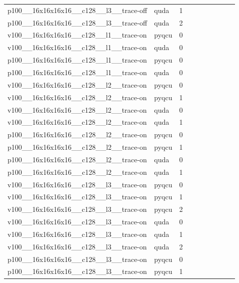 \begin{table}[htbp]
\begin{tabular}{@{}llrrrrrrrr@{}}
p100\_\_16x16x16x16\_\_c128\_\_l3\_\_trace-off & quda & 1 &  &  &  &  &  &  &  \\
p100\_\_16x16x16x16\_\_c128\_\_l3\_\_trace-off & quda & 2 &  &  &  &  &  &  &  \\
v100\_\_16x16x16x16\_\_c128\_\_l1\_\_trace-on & pyqcu & 0 &  &  &  &  &  &  &  \\
v100\_\_16x16x16x16\_\_c128\_\_l1\_\_trace-on & quda & 0 &  &  &  &  &  &  &  \\
p100\_\_16x16x16x16\_\_c128\_\_l1\_\_trace-on & pyqcu & 0 &  &  &  &  &  &  &  \\
p100\_\_16x16x16x16\_\_c128\_\_l1\_\_trace-on & quda & 0 &  &  &  &  &  &  &  \\
v100\_\_16x16x16x16\_\_c128\_\_l2\_\_trace-on & pyqcu & 0 &  &  &  &  &  &  &  \\
v100\_\_16x16x16x16\_\_c128\_\_l2\_\_trace-on & pyqcu & 1 &  &  &  &  &  &  &  \\
v100\_\_16x16x16x16\_\_c128\_\_l2\_\_trace-on & quda & 0 &  &  &  &  &  &  &  \\
v100\_\_16x16x16x16\_\_c128\_\_l2\_\_trace-on & quda & 1 &  &  &  &  &  &  &  \\
p100\_\_16x16x16x16\_\_c128\_\_l2\_\_trace-on & pyqcu & 0 &  &  &  &  &  &  &  \\
p100\_\_16x16x16x16\_\_c128\_\_l2\_\_trace-on & pyqcu & 1 &  &  &  &  &  &  &  \\
p100\_\_16x16x16x16\_\_c128\_\_l2\_\_trace-on & quda & 0 &  &  &  &  &  &  &  \\
p100\_\_16x16x16x16\_\_c128\_\_l2\_\_trace-on & quda & 1 &  &  &  &  &  &  &  \\
v100\_\_16x16x16x16\_\_c128\_\_l3\_\_trace-on & pyqcu & 0 &  &  &  &  &  &  &  \\
v100\_\_16x16x16x16\_\_c128\_\_l3\_\_trace-on & pyqcu & 1 &  &  &  &  &  &  &  \\
v100\_\_16x16x16x16\_\_c128\_\_l3\_\_trace-on & pyqcu & 2 &  &  &  &  &  &  &  \\
v100\_\_16x16x16x16\_\_c128\_\_l3\_\_trace-on & quda & 0 &  &  &  &  &  &  &  \\
v100\_\_16x16x16x16\_\_c128\_\_l3\_\_trace-on & quda & 1 &  &  &  &  &  &  &  \\
v100\_\_16x16x16x16\_\_c128\_\_l3\_\_trace-on & quda & 2 &  &  &  &  &  &  &  \\
p100\_\_16x16x16x16\_\_c128\_\_l3\_\_trace-on & pyqcu & 0 &  &  &  &  &  &  &  \\
p100\_\_16x16x16x16\_\_c128\_\_l3\_\_trace-on & pyqcu & 1 &  &  &  &  &  &  &  \\

\end{tabular}
\end{table}
